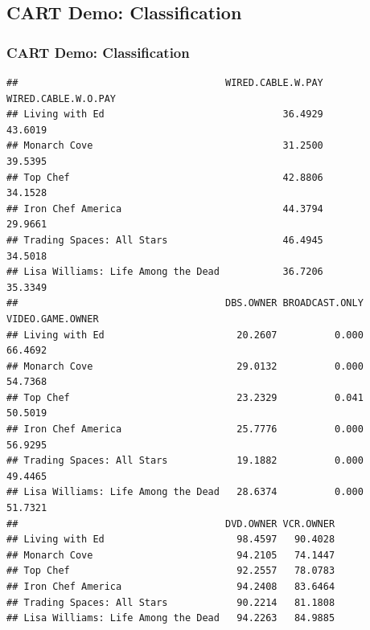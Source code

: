 \documentclass[
  shownotes,
  xcolor={svgnames},
  hyperref={colorlinks,citecolor=DarkBlue,linkcolor=DarkRed,urlcolor=DarkBlue}
  , aspectratio=169]{beamer}
\newenvironment{Shaded}{\begin{snugshade}}{\end{snugshade}}
\newcommand{\CommentTok}[1]{\textcolor[rgb]{0.56,0.35,0.01}{\textit{#1}}}
\newcommand{\DataTypeTok}[1]{\textcolor[rgb]{0.13,0.29,0.53}{#1}}
\newcommand{\DecValTok}[1]{\textcolor[rgb]{0.00,0.00,0.81}{#1}}
\newcommand{\KeywordTok}[1]{\textcolor[rgb]{0.13,0.29,0.53}{\textbf{#1}}}
\newcommand{\NormalTok}[1]{#1}
\newcommand{\OperatorTok}[1]{\textcolor[rgb]{0.81,0.36,0.00}{\textbf{#1}}}
\newcommand{\StringTok}[1]{\textcolor[rgb]{0.31,0.60,0.02}{#1}}
\begin{document}
\subsection{CART Demo: Classification}
\begin{frame}[fragile]
\frametitle{CART Demo: Classification}


\begin{scriptsize}
\begin{Shaded}
\end{Shaded}
\end{scriptsize}

\begin{tiny}
\begin{verbatim}
##                                    WIRED.CABLE.W.PAY WIRED.CABLE.W.O.PAY
## Living with Ed                               36.4929             43.6019
## Monarch Cove                                 31.2500             39.5395
## Top Chef                                     42.8806             34.1528
## Iron Chef America                            44.3794             29.9661
## Trading Spaces: All Stars                    46.4945             34.5018
## Lisa Williams: Life Among the Dead           36.7206             35.3349
##                                    DBS.OWNER BROADCAST.ONLY VIDEO.GAME.OWNER
## Living with Ed                       20.2607          0.000          66.4692
## Monarch Cove                         29.0132          0.000          54.7368
## Top Chef                             23.2329          0.041          50.5019
## Iron Chef America                    25.7776          0.000          56.9295
## Trading Spaces: All Stars            19.1882          0.000          49.4465
## Lisa Williams: Life Among the Dead   28.6374          0.000          51.7321
##                                    DVD.OWNER VCR.OWNER
## Living with Ed                       98.4597   90.4028
## Monarch Cove                         94.2105   74.1447
## Top Chef                             92.2557   78.0783
## Iron Chef America                    94.2408   83.6464
## Trading Spaces: All Stars            90.2214   81.1808
## Lisa Williams: Life Among the Dead   94.2263   84.9885
\end{verbatim}
\end{tiny}

\end{frame}
\end{document}
